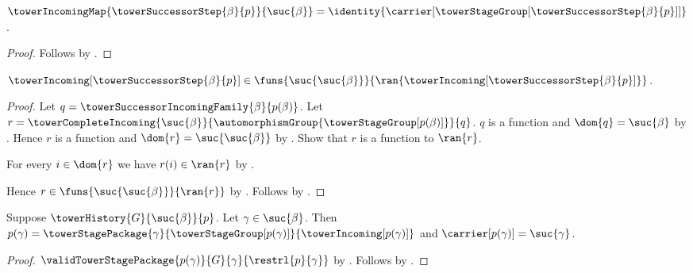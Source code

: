 \begin{proposition}\label{tower_successor_step_incoming_current}
    $\towerIncomingMap{\towerSuccessorStep{\beta}{p}}{\suc{\beta}}=
        \identity{\carrier[
            \towerStageGroup[\towerSuccessorStep{\beta}{p}]]}$.
\end{proposition}
\begin{proof}
    Follows by
        .
\end{proof}

\begin{proposition}\label{tower_successor_step_incoming_type}
    $\towerIncoming[\towerSuccessorStep{\beta}{p}]\in
        \funs{\suc{\suc{\beta}}}{
            \ran{\towerIncoming[\towerSuccessorStep{\beta}{p}]}}$.
\end{proposition}
\begin{proof}
    Let $q=\towerSuccessorIncomingFamily{\beta}{p(\beta)}$.
    Let $r=\towerCompleteIncoming{\suc{\beta}}
        {\automorphismGroup{\towerStageGroup[p(\beta)]}}{q}$.
    $q$ is a function and $\dom{q}=\suc{\beta}$ by
        .
    Hence $r$ is a function and $\dom{r}=\suc{\suc{\beta}}$ by
        .
    Show that $r$ is a function to $\ran{r}$.
    \begin{subproof}
        For every $i\in\dom{r}$ we have $r(i)\in\ran{r}$ by
            .
    \end{subproof}
    Hence $r\in\funs{\suc{\suc{\beta}}}{\ran{r}}$ by
        .
    Follows by .
\end{proof}

\begin{proposition}\label{tower_successor_history_shape}
    Suppose $\towerHistory{G}{\suc{\beta}}{p}$.
    Let $\gamma\in\suc{\beta}$.
    Then $p(\gamma)=\towerStagePackage{\gamma}
            {\towerStageGroup[p(\gamma)]}{\towerIncoming[p(\gamma)]}$ and
        $\carrier[p(\gamma)]=\suc{\gamma}$.
\end{proposition}
\begin{proof}
    $\validTowerStagePackage
        {p(\gamma)}{G}{\gamma}{\restrl{p}{\gamma}}$ by
        .
    Follows by .
\end{proof}

